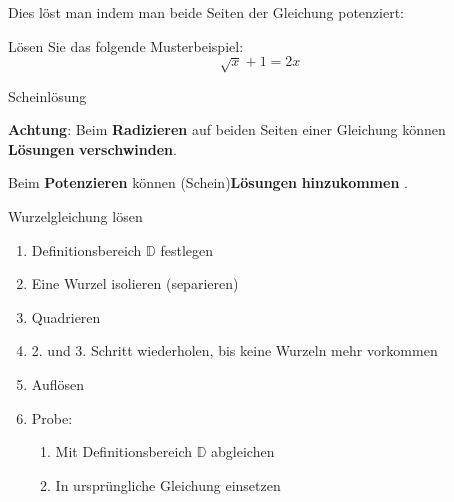 Dies löst man indem man beide Seiten der Gleichung potenziert:

Lösen Sie das folgende Musterbeispiel:
$$\sqrt{x}+1=2x$$


\platzFuerBerechnungenBisEndeSeite{}


\newpage
\begin{bemerkung}{Scheinlösung}{}
  
\textbf{Achtung}: Beim \textbf{Radizieren} auf beiden Seiten
einer Gleichung können \textbf{Lösungen} \textbf{verschwinden}.

Beim \textbf{Potenzieren} können (Schein)\textbf{Lösungen}
\textbf{hinzukommen} .
\end{bemerkung}


\begin{rezept}{Wurzelgleichung lösen}{}
  \begin{enumerate}
  \item Definitionsbereich $\mathbb{D}$ festlegen
  \item Eine Wurzel isolieren (separieren)
  \item Quadrieren
  \item 2. und 3. Schritt wiederholen, bis keine Wurzeln mehr
    vorkommen
  \item Auflösen
  \item Probe:
    \begin{enumerate}
    \item Mit Definitionsbereich $\mathbb{D}$ abgleichen
    \item In ursprüngliche Gleichung einsetzen
    \end{enumerate}
  \end{enumerate}
\end{rezept}
\newpage


